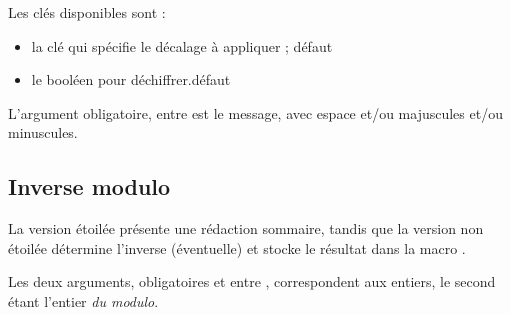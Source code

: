 \begin{cautionblock}
Les clés disponibles sont :

\begin{itemize}
	\item la clé  qui spécifie le décalage à appliquer ; \hfill{}défaut 
	\item le booléen  pour déchiffrer.\hfill{}défaut 
\end{itemize}

L'argument obligatoire, entre  est le message, avec espace et/ou majuscules et/ou minuscules.
\end{cautionblock}

\begin{PresCodePL}{}
\end{PresCodePL}

\begin{PresCodePL}{}
\end{PresCodePL}

\begin{PresCodePL}{}
\end{PresCodePL}

\subsection{Inverse modulo}

\begin{PresCodePL}{}
{}\resinvmod
\end{PresCodePL}

\begin{PresCodePL}{}
\end{PresCodePL}

\begin{cautionblock}
La version étoilée présente une rédaction sommaire, tandis que la version non étoilée détermine l'inverse (éventuelle) et stocke le résultat dans la macro .

Les deux arguments, obligatoires et entre , correspondent aux entiers, le second étant l'entier \textit{du modulo}.
\end{cautionblock}

